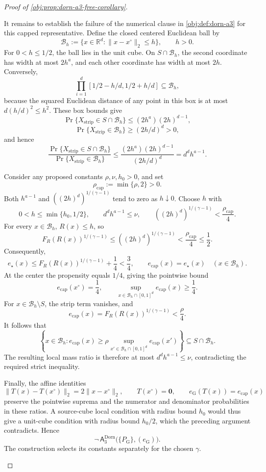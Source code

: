 \documentclass[11pt]{article}
\begin{document}
\begin{proof}[Proof of \cref{obj:prop:dorn-a3-free-corollary}]
\begin{enumerate}
It remains to establish the failure of the numerical clause in
\cref{obj:def:dorn-a3} for this capped representative. Define the closed centered Euclidean ball by
\[
\mathcal B_h:=
\{x\in\mathbb R^d:\|x-x^\circ\|_2\le h\},
\qquad h>0.
\]
For \(0<h\le1/2\), the ball lies in the unit cube. On
\(S\cap\mathcal B_h\), the second coordinate has width at most \(2h^a\), and each other coordinate has width at most \(2h\). Conversely,
\[
\prod_{i=1}^d[1/2-h/d,1/2+h/d]\subseteq\mathcal B_h,
\]
because the squared Euclidean distance of any point in this box is at most
\(d(h/d)^2\le h^2\). These box bounds give
\[
\Pr\{X_{\mathrm{strip}}\in S\cap\mathcal B_h\}
\le (2h^a)(2h)^{d-1},
\]
\[
\Pr\{X_{\mathrm{strip}}\in\mathcal B_h\}
\ge (2h/d)^d>0,
\]
and hence
\[
\frac{\Pr\{X_{\mathrm{strip}}\in S\cap\mathcal B_h\}}
{\Pr\{X_{\mathrm{strip}}\in\mathcal B_h\}}
\le
\frac{(2h^a)(2h)^{d-1}}{(2h/d)^d}
=
d^d h^{a-1}.
\]

Consider any proposed constants \(\rho,\nu,h_0>0\), and set
\[
\rho_{\mathrm{cap}}:=\min\{\rho,2\}>0.
\]
Both \(h^{a-1}\) and \(((2h)^d)^{1/(\gamma-1)}\) tend to zero as \(h\downarrow0\). Choose \(h\) with
\[
0<h\le\min\{h_0,1/2\},
\qquad
d^d h^{a-1}\le\nu,
\qquad
((2h)^d)^{1/(\gamma-1)}
<
\frac{\rho_{\mathrm{cap}}}{4}.
\]
For every \(x\in\mathcal B_h\), \(R(x)\le h\), so
\[
F_R(R(x))^{1/(\gamma-1)}
\le ((2h)^d)^{1/(\gamma-1)}
<
\frac{\rho_{\mathrm{cap}}}{4}
\le\frac12.
\]
Consequently,
\[
e_\star(x)
\le F_R(R(x))^{1/(\gamma-1)}+\frac14
<\frac34,
\qquad
e_{\mathrm{cap}}(x)=e_\star(x)
\quad(x\in\mathcal B_h).
\]
At the center the propensity equals \(1/4\), giving the pointwise bound
\[
e_{\mathrm{cap}}(x^\circ)=\frac14,
\qquad
\sup_{x\in\mathcal B_h\cap[0,1]^d}e_{\mathrm{cap}}(x)\ge\frac14.
\]
For \(x\in\mathcal B_h\setminus S\), the strip term vanishes, and
\[
e_{\mathrm{cap}}(x)
=
F_R(R(x))^{1/(\gamma-1)}
<\frac{\rho}{4}.
\]
It follows that
\[
\left\{
x\in\mathcal B_h:
e_{\mathrm{cap}}(x)\ge
\rho\sup_{x'\in\mathcal B_h\cap[0,1]^d}e_{\mathrm{cap}}(x')
\right\}
\subseteq S\cap\mathcal B_h.
\]
The resulting local mass ratio is therefore at most
\(d^d h^{a-1}\le\nu\), contradicting the required strict inequality.

Finally, the affine identities
\[
\|T(x)-T(x^\circ)\|_2=2\|x-x^\circ\|_2,
\qquad
T(x^\circ)=\mathbf0,
\qquad
e_{\mathrm G}(T(x))=e_{\mathrm{cap}}(x)
\]
preserve the pointwise suprema and the numerator and denominator probabilities in these ratios. A source-cube local condition with radius bound \(h_0\) would thus give a unit-cube condition with radius bound \(h_0/2\), which the preceding argument contradicts. Hence
\[
\neg\,\mathsf A_3^{\mathrm{Dorn}}
\bigl(\{P_{\mathrm G}\},(e_{\mathrm G})\bigr).
\]
The construction selects its constants separately for the chosen \(\gamma\).


\end{enumerate}
\end{proof}
\end{document}
